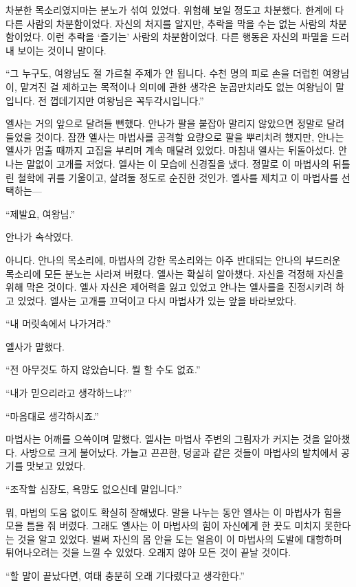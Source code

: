 차분한 목소리였지마는 분노가 섞여 있었다. 위험해 보일 정도고 차분했다. 한계에 다다른 사람의 차분함이었다. 자신의 처지를 알지만, 추락을 막을 수는 없는 사람의 차분함이었다. 이런 추락을 `즐기는' 사람의 차분함이었다. 다른 행동은 자신의 파멸을 드러내 보이는 것이니 말이다.

``그 누구도, 여왕님도 절 가르칠 주제가 안 됩니다. 수천 명의 피로 손을 더럽힌 여왕님이, 맡겨진 걸 제하고는 목적이나 의미에 관한 생각은 눈곱만치라도 없는 여왕님이 말입니다. 전 껍데기지만 여왕님은 꼭두각시입니다.''

엘사는 거의 앞으로 달려들 뻔했다. 안나가 팔을 붙잡아 말리지 않았으면 정말로 달려들었을 것이다. 잠깐 엘사는 마법사를 공격할 요량으로 팔을 뿌리치려 했지만, 안나는 엘사가 멈출 때까지 고집을 부리며 계속 매달려 있었다. 마침내 엘사는 뒤돌아섰다. 안나는 말없이 고개를 저었다. 엘사는 이 모습에 신경질을 냈다. 정말로 이 마법사의 뒤틀린 철학에 귀를 기울이고, 살려둘 정도로 순진한 것인가. 엘사를 제치고 이 마법사를 선택하는—

``제발요, 여왕님.''

안나가 속삭였다.

아니다. 안나의 목소리에, 마법사의 강한 목소리와는 아주 반대되는 안나의 부드러운 목소리에 모든 분노는 사라져 버렸다. 엘사는 확실히 알아챘다. 자신을 걱정해 자신을 위해 막은 것이다. 엘사 자신은 제어력을 잃고 있었고 안나는 엘사를을 진정시키려 하고 있었다. 엘사는 고개를 끄덕이고 다시 마법사가 있는 앞을 바라보았다.

``내 머릿속에서 나가거라.''

엘사가 말했다.

``전 아무것도 하지 않았습니다. 뭘 할 수도 없죠.''

``내가 믿으리라고 생각하느냐?''

``마음대로 생각하시죠.''

마법사는 어깨를 으쓱이며 말했다. 엘사는 마법사 주변의 그림자가 커지는 것을 알아챘다. 사방으로 크게 불어났다. 가늘고 끈끈한, 덩굴과 같은 것들이 마법사의 발치에서 공기를 맛보고 있었다.

``조작할 심장도, 욕망도 없으신데 말입니다.''

뭐, 마법의 도움 없이도 확실히 잘해냈다. 말을 나누는 동안 엘사는 이 마법사가 힘을 모을 틈을 줘 버렸다. 그래도 엘사는 이 마법사의 힘이 자신에게 한 끗도 미치지 못한다는 것을 알고 있었다. 벌써 자신의 몸 안을 도는 얼음이 이 마법사의 도발에 대항하며 튀어나오려는 것을 느낄 수 있었다. 오래지 않아 모든 것이 끝날 것이다.

``할 말이 끝났다면, 여태 충분히 오래 기다렸다고 생각한다.''

